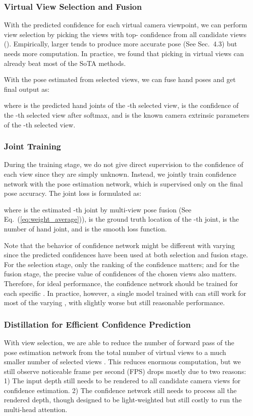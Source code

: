 \documentclass[letterpaper]{article} \usepackage{aaai22}  \usepackage{times}  \usepackage{helvet}  \usepackage{courier}  \usepackage[hyphens]{url}  \usepackage{graphicx} \urlstyle{rm} \def\UrlFont{\rm}  \usepackage{natbib}  \usepackage{caption} \DeclareCaptionStyle{ruled}{labelfont=normalfont,labelsep=colon,strut=off} \frenchspacing  \setlength{\pdfpagewidth}{8.5in}  \setlength{\pdfpageheight}{11in}  \usepackage{algorithm}
\begin{document}
\subsubsection{Virtual View Selection and Fusion}
With the predicted confidence for each virtual camera viewpoint, we can perform view selection by picking the views with top- 
confidence from all  candidate views ().
Empirically, larger  tends to produce more accurate pose (See Sec.~4.3) but needs more computation.
In practice, we found that picking  in  virtual views can already beat most of the SoTA methods.

With the pose estimated from selected views,
we can fuse hand poses and get final output  as:

where  is the predicted hand joints of the -th selected view,  is the confidence of the -th selected view after softmax, and  is the known camera extrinsic parameters of the -th selected view.

\subsubsection{Joint Training}
During the training stage, we do not give direct supervision to the confidence of each view since they are simply unknown.
Instead, we jointly train confidence network with the pose estimation network, which is supervised only on the final pose accuracy.
The joint loss  is formulated as:

where  is the estimated -th joint by multi-view pose fusion (See Eq.~(\ref{eq:weight_average})),  is the ground truth location of the -th joint,  is the number of hand joint, and  is the smooth loss function. 

Note that the behavior of confidence network might be different with varying  since the predicted confidences have been used at both selection and fusion stage.
For the selection stage, only the ranking of the confidence matters; and for the fusion stage, the precise value of confidences of the chosen views also matters.
Therefore, for ideal performance, the confidence network should be trained for each specific .
In practice, however, a single model trained with  can still work for most of the varying , with slightly worse but still reasonable performance.

\subsubsection{Distillation for Efficient Confidence Prediction}
With view selection, we are able to reduce the number of forward pass of the pose estimation network from the total number of virtual views  to a much smaller number of selected views .
This reduces enormous computation, but we still observe noticeable frame per second (FPS) drops mostly due to two reasons: 1) The input depth still needs to be rendered to all candidate camera views for confidence estimation. 2) The confidence network still needs to process all the rendered depth, though designed to be light-weighted but still costly to run the multi-head attention.
\end{document}
